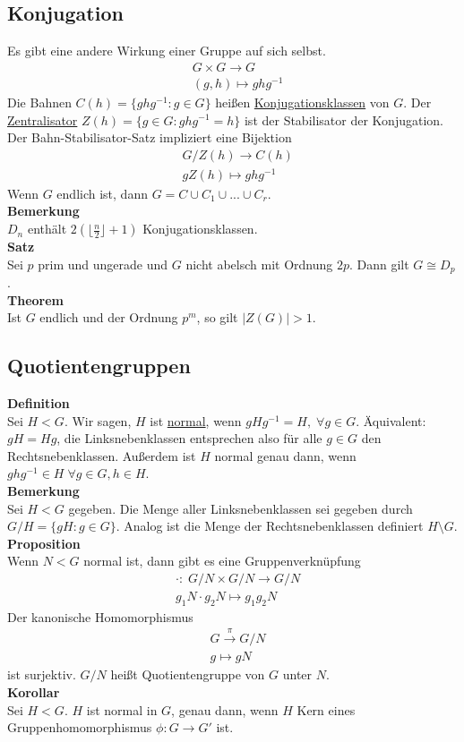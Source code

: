 \documentclass[a4paper, 12pt]{article}
\begin{document}
\subsection{Konjugation}
Es gibt eine andere Wirkung einer Gruppe auf sich selbst. \begin{eqnarray*}
	&G\times G \to G\\
	&(g,h) \mapsto ghg^{-1}
\end{eqnarray*}
Die Bahnen $C(h) = \{ghg^{-1}: g \in G\}$ heißen \underline{Konjugationsklassen} von $G$. Der \underline{Zentralisator} $Z(h) = \{g \in G: ghg^{-1} = h\}$ ist der Stabilisator der Konjugation. Der Bahn-Stabilisator-Satz impliziert eine Bijektion \begin{eqnarray*}
	&G/Z(h) \to C(h)\\
	&gZ(h) \mapsto ghg^{-1}
\end{eqnarray*}
Wenn $G$ endlich ist, dann $G = C\cup C_1 \cup ... \cup C_r$.\\
\textbf{Bemerkung}\\
$D_n$ enthält $2(\lfloor\frac{n}{2}\rfloor +1)$ Konjugationsklassen.\\
\textbf{Satz}\\
Sei $p$ prim und ungerade und $G$ nicht abelsch mit Ordnung $2p$. Dann gilt $G\cong D_{p}$.\\
\textbf{Theorem}\\
Ist $G$ endlich und der Ordnung $p^m$, so gilt $\left|Z(G)\right|>1$.
\subsection{Quotientengruppen}
\textbf{Definition}\\
Sei $H<G$. Wir sagen, $H$ ist \underline{normal}, wenn $gHg^{-1} = H, \; \forall g \in G$. Äquivalent: $gH = Hg$, die Linksnebenklassen entsprechen also für alle $g \in G$ den Rechtsnebenklassen. Außerdem ist $H$ normal genau dann, wenn $ghg^{-1} \in H \; \forall g\in G, h \in H$.\\
\textbf{Bemerkung}\\
Sei $H<G$ gegeben. Die Menge aller Linksnebenklassen sei gegeben durch $G/H = \{gH: g \in G\}$. Analog ist die Menge der Rechtsnebenklassen definiert $H\setminus G$.\\
\textbf{Proposition}\\
Wenn $N<G$ normal ist, dann gibt es eine Gruppenverknüpfung \begin{eqnarray*}
	& \cdot:\; G/N \times G/N \to G/N\\
	& g_1N \cdot g_2N \mapsto g_1g_2N
\end{eqnarray*}
Der kanonische Homomorphismus \begin{eqnarray*}
	& G \overset{\pi}{\to} G/N\\
	& g \mapsto gN
\end{eqnarray*}
ist surjektiv. $G/N$ heißt Quotientengruppe von $G$ unter $N$.\\
\textbf{Korollar}\\
Sei $H<G$. $H$ ist normal in $G$, genau dann, wenn $H$ Kern eines Gruppenhomomorphismus $\phi: G \to G'$ ist.
\end{document}

